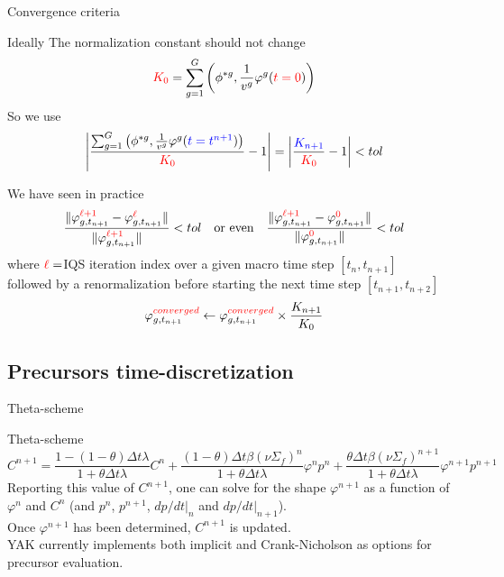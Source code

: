 \documentclass[8pt]{beamer}
\newcommand{\be}{\begin{equation}}
\newcommand{\ee}{\end{equation}}
\newcommand{\tcr}[1]{\textcolor{red}{#1}}
\newcommand{\tcb}[1]{\textcolor{blue}{#1}}
\begin{document}
\begin{frame}{Convergence criteria}


\begin{block}{Ideally}
The normalization constant should not change
\be
\tcr{K_0} = \sum_{g=1}^G\left(\phi^{*g},\frac{1}{v^g}\varphi^g(\tcr{t=0})\right)
\ee
So we use
\be
\left| \frac{\sum_{g=1}^G\left(\phi^{*g},\frac{1}{v^g}\varphi^g(\tcb{t=t^{n+1}})\right)}{\tcr{K_0}}-1\right| 
= \left| \frac{\tcb{K_{n+1}}}{{\tcr{K_0}}}-1\right|  < tol
\ee
\end{block}

\begin{block}{We have seen in practice}
\be
\frac{ \| \varphi_{g,t_{n+1}}^{\tcr{\ell+1}} - \varphi_{g,t_{n+1}}^{\tcr{\ell}} \|}{\| \varphi_{g,t_{n+1}}^{\tcr{\ell+1}} \|} < tol 
\quad \text{or even} \quad
\frac{ \| \varphi_{g,t_{n+1}}^{\tcr{\ell+1}} - \varphi_{g,t_{n+1}}^{\tcr{0}} \|}{\| \varphi_{g,t_{n+1}}^{\tcr{0}} \|} < tol 
\ee
where $\tcr{\ell}=$IQS iteration index over a given macro time step $[t_n,t_{n+1}]$\\
followed by a renormalization before starting the next time step $[t_{n+1},t_{n+2}]$
\be
\varphi_{g,t_{n+1}}^{\tcr{converged}} \leftarrow \varphi_{g,t_{n+1}}^{\tcr{converged}} \times \frac{K_{n+1}}{K_0}
\ee
\end{block}


\end{frame}

\subsection{Precursors time-discretization}

\begin{frame}{Theta-scheme}


\begin{block}{Theta-scheme}
\be
C^{n+1} = \frac{1-(1-\theta)\Delta t\lambda}{1+\theta\Delta t\lambda}C^n + \frac{(1-\theta)\Delta t \beta (\nu\Sigma_f)^n}{1+\theta\Delta t\lambda}\varphi^n p^n +  \frac{\theta\Delta t \beta (\nu\Sigma_f)^{n+1}}{1+\theta\Delta t\lambda}\varphi^{n+1} p^{n+1}
\ee
Reporting this value of $C^{n+1}$, one can solve for the shape $\varphi^{n+1}$ as a function of $\varphi^n$ and $C^n$
(and $p^n$, $p^{n+1}$, $dp/dt|_n$ and  $dp/dt|_{n+1}$).\\

\bigskip
Once $\varphi^{n+1}$ has been determined, $C^{n+1}$ is updated. \\

\medskip
YAK currently implements both implicit and Crank-Nicholson as options for precursor evaluation.


\end{block}

\end{frame}
\end{document}

